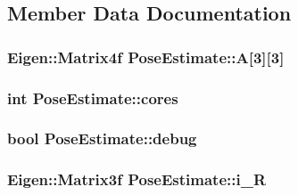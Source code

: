 \subsection{\-Member \-Data \-Documentation}
\hypertarget{classPoseEstimate_ad4827d1aca3b4730d6e8c0cf4e96deca}{
\subsubsection[{\-A}]{\setlength{\rightskip}{0pt plus 5cm}\-Eigen\-::\-Matrix4f {\bf \-Pose\-Estimate\-::\-A}\mbox{[}3\mbox{]}\mbox{[}3\mbox{]}}}\label{classPoseEstimate_ad4827d1aca3b4730d6e8c0cf4e96deca}
\hypertarget{classPoseEstimate_a9b1cbebd4de554e6c0b4607a2a462a92}{
\subsubsection[{cores}]{\setlength{\rightskip}{0pt plus 5cm}int {\bf \-Pose\-Estimate\-::cores}}}\label{classPoseEstimate_a9b1cbebd4de554e6c0b4607a2a462a92}
\hypertarget{classPoseEstimate_a81f2cf4c423887225557200a6da5744e}{
\subsubsection[{debug}]{\setlength{\rightskip}{0pt plus 5cm}bool {\bf \-Pose\-Estimate\-::debug}}}\label{classPoseEstimate_a81f2cf4c423887225557200a6da5744e}
\hypertarget{classPoseEstimate_ac6b2c23e4121d00a14d4a8245cad86ab}{
\subsubsection[{i\-\_\-\-R}]{\setlength{\rightskip}{0pt plus 5cm}\-Eigen\-::\-Matrix3f {\bf \-Pose\-Estimate\-::i\-\_\-\-R}}}\label{classPoseEstimate_ac6b2c23e4121d00a14d4a8245cad86ab}
